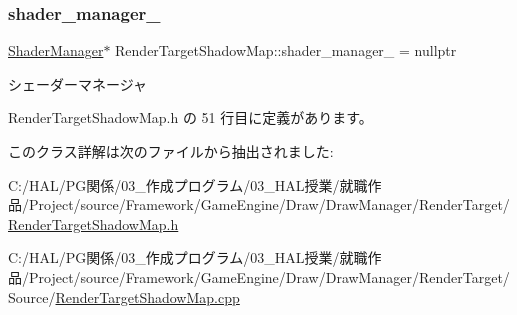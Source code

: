 \mbox{\label{class_render_target_shadow_map_a05ee7ec6d95ec144cca0847bb880c9cb}} 
\subsubsection{\texorpdfstring{shader\+\_\+manager\+\_\+}{shader\_manager\_}}
{\footnotesize\ttfamily \mbox{\hyperlink{class_shader_manager}{Shader\+Manager}}$\ast$ Render\+Target\+Shadow\+Map\+::shader\+\_\+manager\+\_\+ = nullptr\hspace{0.3cm}{\ttfamily [private]}}



シェーダーマネージャ 



 Render\+Target\+Shadow\+Map.\+h の 51 行目に定義があります。



このクラス詳解は次のファイルから抽出されました\+:\begin{DoxyCompactItemize}
\item 
C\+:/\+H\+A\+L/\+P\+G関係/03\+\_\+作成プログラム/03\+\_\+\+H\+A\+L授業/就職作品/\+Project/source/\+Framework/\+Game\+Engine/\+Draw/\+Draw\+Manager/\+Render\+Target/\mbox{\hyperlink{_render_target_shadow_map_8h}{Render\+Target\+Shadow\+Map.\+h}}\item 
C\+:/\+H\+A\+L/\+P\+G関係/03\+\_\+作成プログラム/03\+\_\+\+H\+A\+L授業/就職作品/\+Project/source/\+Framework/\+Game\+Engine/\+Draw/\+Draw\+Manager/\+Render\+Target/\+Source/\mbox{\hyperlink{_render_target_shadow_map_8cpp}{Render\+Target\+Shadow\+Map.\+cpp}}\end{DoxyCompactItemize}

